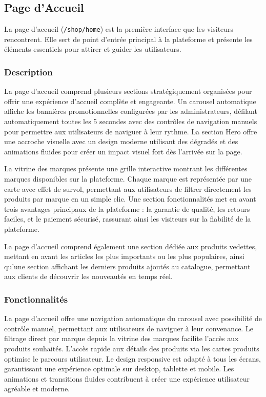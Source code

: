 \documentclass[12pt,a4paper]{article}
\begin{document}
\subsection{Page d'Accueil}

La page d'accueil (\texttt{/shop/home}) est la première interface que les visiteurs rencontrent. Elle sert de point d'entrée principal à la plateforme et présente les éléments essentiels pour attirer et guider les utilisateurs.

\subsubsection{Description}

La page d'accueil comprend plusieurs sections stratégiquement organisées pour offrir une expérience d'accueil complète et engageante. Un carousel automatique affiche les bannières promotionnelles configurées par les administrateurs, défilant automatiquement toutes les 5 secondes avec des contrôles de navigation manuels pour permettre aux utilisateurs de naviguer à leur rythme. La section Hero offre une accroche visuelle avec un design moderne utilisant des dégradés et des animations fluides pour créer un impact visuel fort dès l'arrivée sur la page.

La vitrine des marques présente une grille interactive montrant les différentes marques disponibles sur la plateforme. Chaque marque est représentée par une carte avec effet de survol, permettant aux utilisateurs de filtrer directement les produits par marque en un simple clic. Une section fonctionnalités met en avant trois avantages principaux de la plateforme : la garantie de qualité, les retours faciles, et le paiement sécurisé, rassurant ainsi les visiteurs sur la fiabilité de la plateforme.

La page d'accueil comprend également une section dédiée aux produits vedettes, mettant en avant les articles les plus importants ou les plus populaires, ainsi qu'une section affichant les derniers produits ajoutés au catalogue, permettant aux clients de découvrir les nouveautés en temps réel.

\subsubsection{Fonctionnalités}

La page d'accueil offre une navigation automatique du carousel avec possibilité de contrôle manuel, permettant aux utilisateurs de naviguer à leur convenance. Le filtrage direct par marque depuis la vitrine des marques facilite l'accès aux produits souhaités. L'accès rapide aux détails des produits via les cartes produits optimise le parcours utilisateur. Le design responsive est adapté à tous les écrans, garantissant une expérience optimale sur desktop, tablette et mobile. Les animations et transitions fluides contribuent à créer une expérience utilisateur agréable et moderne.
\end{document}

